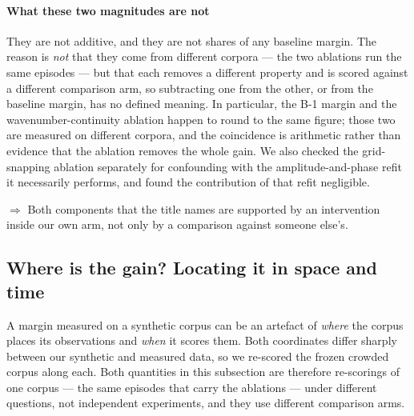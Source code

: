 \documentclass[review]{elsarticle}
\begin{document}
\paragraph{What these two magnitudes are not}
They are not additive, and they are not shares of any baseline margin. The reason is
\emph{not} that they come from different corpora --- the two ablations run the same
\AblationEps{} episodes --- but that each removes a different property and is scored
against a different comparison arm, so subtracting one from the other, or from the
baseline margin, has no defined meaning. In particular, the B-1 margin and the
wavenumber-continuity ablation happen to round to the same figure; those two are
measured on different corpora, and the coincidence is arithmetic rather than evidence
that the ablation removes the whole gain.
We also checked the grid-snapping ablation separately for
confounding with the amplitude-and-phase refit it necessarily performs, and found the
contribution of that refit negligible.

$\Rightarrow$ Both components that the title names are supported by an intervention
inside our own arm, not only by a comparison against someone else's.

\subsection{Where is the gain? Locating it in space and time}
\label{sec:res_where}

A margin measured on a synthetic corpus can be an artefact of \emph{where} the
corpus places its observations and \emph{when} it scores them. Both coordinates
differ sharply between our synthetic and measured data, so we re-scored the frozen
crowded corpus along each. Both quantities in this subsection are therefore
re-scorings of one corpus --- the same \AblationEps{} episodes that carry the
ablations --- under different questions, not independent experiments, and they use
different comparison arms.
\end{document}
